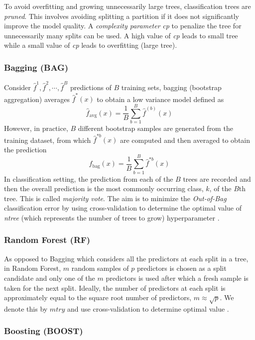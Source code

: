 \noindent To avoid overfitting and growing unnecessarily large trees, classification trees are \textit{pruned}. This involves avoiding splitting a partition if it does not significantly improve the model quality. A \textit{complexity parameter} \textit{cp} to penalize the tree for  unnecessarily many splits can be used. A high value of \textit{cp} leads to small tree while a small value of \textit{cp} leads to overfitting (large tree). 

\subsubsection{Bagging (BAG)}

Consider $\hat{f}^1, \hat{f}^2, \cdots, \hat{f}^B$ predictions of $B$ training sets, bagging (bootstrap aggregation) averages $\hat{f}^*(x)$ to obtain a low variance model defined as
\[
\hat{f}_{\text{avg}}(x) = \frac{1}{B}\sum^{B}_{b=1}{\hat{f}^{(b)}(x)}
\]
However, in practice, $B$ different bootstrap samples are generated from the training dataset, from which $\hat{f}^{*b}(x)$ are computed and then averaged to obtain the prediction 
\[
\hat{f}_{\text{bag}}(x) = \frac{1}{B}\sum^{B}_{b=1}{\hat{f}^{*b}(x)}
\]
In classification setting, the prediction from each of the $B$ trees are recorded and then the overall prediction is the most commonly occurring class, $k$, of the $B$th tree. This is called \textit{majority vote}. The aim is to minimize the \textit{Out-of-Bag} classification error by using cross-validation to determine  the optimal value of \textit{ntree} (which represents the number of trees to grow) hyperparameter \citep{james2013introduction}.

\subsubsection{Random Forest (RF)}

As opposed to Bagging which considers all the predictors at each split in a tree, in Random Forest, $m$ random samples of $p$ predictors is chosen as a split candidate and only one of the $m$ predictors is used after which a fresh sample is taken for the next split. Ideally, the number of predictors at each split is approximately equal to the square root number of predictors, $m\approx\sqrt{p}$. We denote this by $mtry$ and use cross-validation to determine optimal value \citep{james2013introduction}. 

\subsubsection{Boosting (BOOST)}


